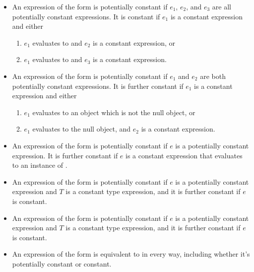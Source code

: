 \documentclass[makeidx]{article}
\begin{document}
{\begin{itemize}
\item An expression of the form 
  is potentially constant if $e_1$, $e_2$, and $e_3$
  are all potentially constant expressions.
  It is constant if $e_1$ is a constant expression and either
\begin{enumerate}
\item $e_1$ evaluates to \TRUE{} and $e_2$ is a constant expression, or
\item $e_1$ evaluates to \FALSE{} and $e_3$ is a constant expression.
\end{enumerate}

\item An expression of the form  is potentially constant
  if $e_1$ and $e_2$ are both potentially constant expressions.
  It is further constant if $e_1$ is a constant expression and either
\begin{enumerate}
\item $e_1$ evaluates to an object which is not the null object, or
\item $e_1$ evaluates to the null object, and $e_2$ is a constant expression.
\end{enumerate}

\item An expression of the form  is potentially constant
  if $e$ is a potentially constant expression.
  It is further constant if $e$ is a constant expression that
  evaluates to an instance of .

\item An expression of the form  is potentially constant
  if $e$ is a potentially constant expression
  and $T$ is a constant type expression,
  and it is further constant if $e$ is constant.

\item An expression of the form  is potentially constant
  if $e$ is a potentially constant expression
  and $T$ is a constant type expression,
  and it is further constant if $e$ is constant.

\item{}
  An expression of the form 
  is equivalent to  in every way,
  including whether it's potentially constant or constant.
\end{itemize}

}
\end{document}
